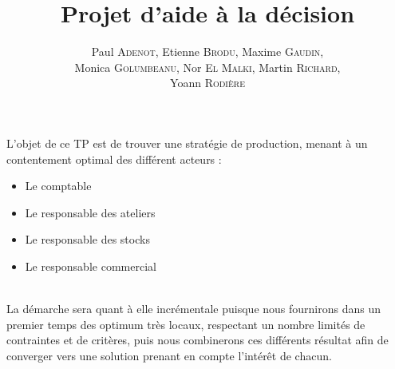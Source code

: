 \documentclass[a4paper,11pt]{article}
\title{\textbf{Projet d'aide à la décision}}
\author{Paul \textsc{Adenot}, Etienne \textsc{Brodu}, Maxime \textsc{Gaudin},\\
Monica \textsc{Golumbeanu}, Nor \textsc{El Malki}, Martin \textsc{Richard},\\
Yoann \textsc{Rodière}}
\begin{document}
\maketitle
\tableofcontents 

\begin{nAbstract}
L'objet de ce TP est de trouver une stratégie de production, menant à un
contentement optimal des différent acteurs :
\begin{itemize}
  \item Le comptable
  \item Le responsable des ateliers
  \item Le responsable des stocks
  \item Le responsable commercial
\end{itemize}
~\\
La démarche sera quant à elle incrémentale puisque nous fournirons dans un
premier temps des optimum très locaux, respectant un nombre limités de
contraintes et de critères, puis nous combinerons ces différents résultat afin
de converger vers une solution prenant en compte l'intérêt de chacun.
\end{nAbstract}





\end{document}
